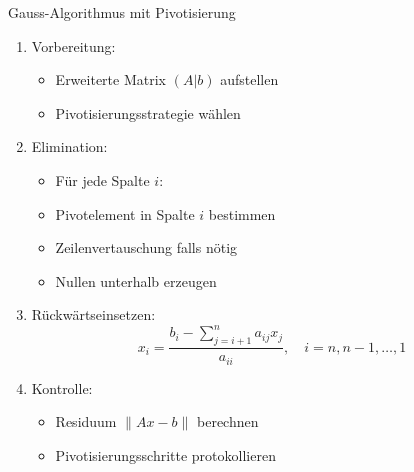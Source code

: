 \begin{KR}{Gauss-Algorithmus mit Pivotisierung}
\begin{enumerate}
    \item Vorbereitung:
    \begin{itemize}
        \item Erweiterte Matrix $(A|b)$ aufstellen
        \item Pivotisierungsstrategie wählen
    \end{itemize}
    
    \item Elimination:
    \begin{itemize}
        \item Für jede Spalte $i$:
        \item Pivotelement in Spalte $i$ bestimmen
        \item Zeilenvertauschung falls nötig
        \item Nullen unterhalb erzeugen
    \end{itemize}
    
    \item Rückwärtseinsetzen:
    $$x_i = \frac{b_i - \sum_{j=i+1}^n a_{ij}x_j}{a_{ii}}, \quad i=n,n-1,\ldots,1$$
    
    \item Kontrolle:
    \begin{itemize}
        \item Residuum $\|Ax-b\|$ berechnen
        \item Pivotisierungsschritte protokollieren
    \end{itemize}
\end{enumerate}
\end{KR}

